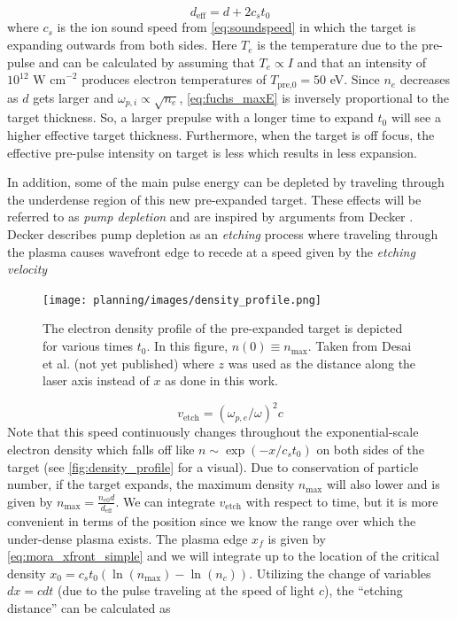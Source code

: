 \begin{equation}
	d_\text{eff} = d + 2 c_s t_0 \label{eq:d_eff}
\end{equation}
where $c_s$ is the ion sound speed from \cref{eq:soundspeed} in which the target is expanding outwards from both sides. Here $T_e$ is the temperature due to the pre-pulse and can be calculated by assuming that $T_e \propto I$ and that an intensity of $10^{12} \text{ W cm}^{-2}$ produces electron temperatures of $T_\text{pre,0} = 50$ eV. Since $n_e$ decreases as $d$ gets larger and $\omega_{p,i} \propto \sqrt{n_e}$, \autoref{eq:fuchs_maxE} is inversely proportional to the target thickness. So, a larger prepulse with a longer time to expand $t_0$ will see a higher effective target thickness. Furthermore, when the target is off focus, the effective pre-pulse intensity on target is less which results in less expansion.

In addition, some of the main pulse energy can be depleted by traveling through the underdense region of this new pre-expanded target. These effects will be referred to as \emph{pump depletion} and are inspired by arguments from Decker \cite{Decker_1996_PoP}. Decker describes pump depletion as an \emph{etching} process where traveling through the plasma causes wavefront edge to recede at a speed given by the \emph{etching velocity} 

\begin{figure}
	\centering 
	\texttt{[image: planning/images/density\_profile.png]}
	\caption{The electron density profile of the pre-expanded target is depicted for various times $t_0$. In this figure, $n(0) \equiv n_\text{max}$. Taken from Desai et al. \cite{Desai_2025_APL} (not yet published) where $z$ was used as the distance along the laser axis instead of $x$ as done in this work. }
	\label{fig:density_profile}
\end{figure}
\begin{equation}
	v_\text{etch} = (\omega_{p,e}/\omega)^2 c \label{eq:vetch}
\end{equation}
Note that this speed continuously changes throughout the exponential-scale electron density which falls off like $n \sim \exp(-x/c_s t_0)$ on both sides of the target (see \autoref{fig:density_profile} for a visual). Due to conservation of particle number, if the target expands, the maximum density $n_\text{max}$ will also lower and is given by $n_\text{max} = \frac{n_{e0} d}{d_\text{eff}}$. We can integrate $v_\text{etch}$ with respect to time, but it is more convenient in terms of the position since we know the range over which the under-dense plasma exists. The plasma edge $x_f$ is given by \autoref{eq:mora_xfront_simple} and we will integrate up to the location of the critical density $x_0 = c_s t_0 (\ln(n_\text{max}) - \ln(n_c))$. Utilizing the change of variables $dx = c dt$ (due to the pulse traveling at the speed of light $c$), the ``etching distance'' can be calculated as \cite{Desai_2025_APL} 

